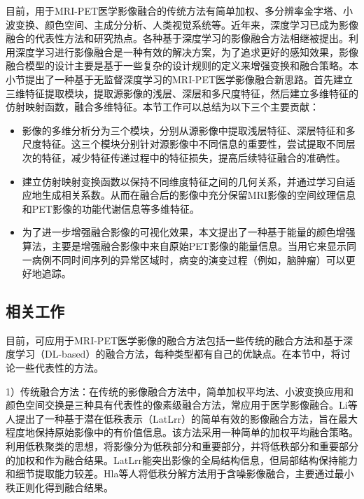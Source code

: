 目前，用于MRI-PET医学影像融合的传统方法有简单加权\cite{2018Infrared}、多分辨率金字塔\cite{2014Quantum}、小波变换\cite{2019Waveatom}、颜色空间\cite{2020An}、主成分分析\cite{2018Improved}、人类视觉系统\cite{2017Multifocus}等。近年来，深度学习已成为影像融合的代表性方法和研究热点。各种基于深度学习的影像融合方法相继被提出\cite{2018Deep,Zhong2016Image,liu2019medical}。利用深度学习进行影像融合是一种有效的解决方案，为了追求更好的感知效果，影像融合模型的设计主要是基于一些复杂的设计规则的定义来增强变换和融合策略。本小节提出了一种基于无监督深度学习的MRI-PET医学影像融合新思路。首先建立三维特征提取模块，提取源影像的浅层、深层和多尺度特征，然后建立多维特征的仿射映射函数，融合多维特征。本节工作可以总结为以下三个主要贡献：
\begin{itemize}
    \item 影像的多维分析分为三个模块，分别从源影像中提取浅层特征、深层特征和多尺度特征。这三个模块分别针对源影像中不同信息的重要性，尝试提取不同层次的特征，减少特征传递过程中的特征损失，提高后续特征融合的准确性。
    \item 建立仿射映射变换函数以保持不同维度特征之间的几何关系，并通过学习自适应地生成相关系数。从而在融合后的影像中充分保留MRI影像的空间纹理信息和PET影像的功能代谢信息等多维特征。
    \item 为了进一步增强融合影像的可视化效果，本文提出了一种基于能量的颜色增强算法，主要是增强融合影像中来自原始PET影像的能量信息。当用它来显示同一病例不同时间序列的异常区域时，病变的演变过程（例如，脑肿瘤）可以更好地追踪。
\end{itemize}


\subsection{相关工作}
目前，可应用于MRI-PET医学影像的融合方法包括一些传统的融合方法和基于深度学习（DL-based）的融合方法，每种类型都有自己的优缺点。在本节中，将讨论一些代表性的方法。

1）传统融合方法：在传统的影像融合方法中，简单加权平均法、小波变换应用和颜色空间交换是三种具有代表性的像素级融合方法，常应用于医学影像融合。Li等人\cite{2018Infrared}提出了一种基于潜在低秩表示（LatLrr）的简单有效的影像融合方法，旨在最大程度地保持原始影像中的有价值信息。该方法采用一种简单的加权平均融合策略。利用低秩聚类的思想，将影像分为低秩部分和重要部分，并将低秩部分和重要部分的加权和作为融合结果。LatLrr能突出影像的全局结构信息，但局部结构保持能力和细节提取能力较差。Hla等人\cite{2020Noise}将低秩分解方法用于含噪影像融合，主要通过最小秩正则化得到融合结果。

